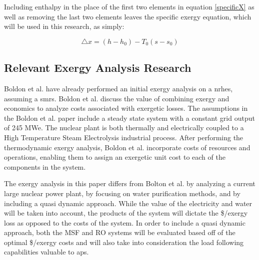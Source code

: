 Including enthalpy in the place of the first two elements in equation \ref{specificX} as well as removing the last two elements leaves the specific exergy equation, which will be used in this research, as simply:

\begin{equation}
\triangle x=(h-h_0)-T_0(s-s_0)
\end{equation}

\subsection{Relevant Exergy Analysis Research}
Boldon et al. have already performed an initial exergy analysis on a \ac{nrhes}, assuming a \ac{smrs}\cite{Boldon}. Boldon et al. discuss the value of combining exergy and economics to analyze costs associated with exergetic losses. The assumptions in the Boldon et al. paper include a steady state system with a constant grid output of 245 MWe.  The nuclear plant is both thermally and electrically coupled to a High Temperature Steam Electrolysis industrial process. After performing the thermodynamic exergy analysis, Boldon et al. incorporate costs of resources and operations, enabling them to assign an exergetic unit cost to each of the components in the system. 

The exergy analysis in this paper differs from Bolton et al. by analyzing a current large nuclear power plant, by focusing on water purification methods, and by including a quasi dynamic approach.  While the value of the electricity and water will be taken into account, the products of the system will dictate the \$/exergy loss as opposed to the costs of the system. In order to include a quasi dynamic approach, both the MSF and RO systems will be evaluated based off of the optimal \$/exergy costs and will also take into consideration the load following capabilities valuable to \ac{aps}.

